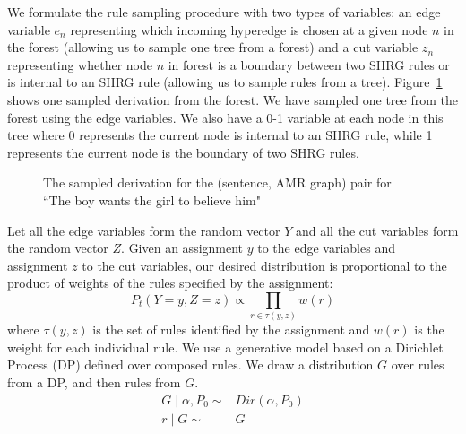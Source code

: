 We formulate
the rule sampling procedure with two types of variables: an edge variable $e_n$ representing which incoming hyperedge is chosen at a given node $n$ in the 
forest (allowing us to sample one tree from a forest) and a cut variable $z_n$ representing whether node $n$ in forest is a boundary between two SHRG rules
or is internal to an SHRG rule (allowing us to sample rules from a tree). 
Figure~\ref{fig:sampled-example} shows one sampled derivation from the forest.
We have sampled one tree from the forest using the edge variables.  We also have a 0-1 variable at each node in this tree where 0 represents the 
current node is internal to an SHRG rule, while 1 represents the current node is the boundary of two SHRG rules.
\begin{figure}
\begin{center}
\caption{The sampled derivation for the (sentence, AMR graph) pair for ``The boy wants the girl to believe him"}
\label{fig:sampled-example}
\end{center}
\end{figure}

Let all the edge variables form the random vector $Y$ and all the cut variables form the random vector $Z$. Given an assignment $y$ to the edge variables and assignment $z$ to the cut variables, our desired distribution is proportional to the product of weights of the rules specified by the assignment:
\begin{equation}\label{eq:tsg}
 P_t(Y=y, Z=z) \propto \prod_{r \in \tau(y, z)} w(r) 
\end{equation}
where $\tau(y, z)$ is the set of rules identified by the assignment and $w(r)$ is the weight for each individual rule. We use a generative model based on a Dirichlet Process (DP) defined over composed rules. We draw a distribution $G$ over rules from a DP, and then rules from $G$. 
\begin{align*}
G\mid \alpha,P_0\sim& Dir(\alpha,P_0)\\
r\mid G\sim& G
\end{align*}

